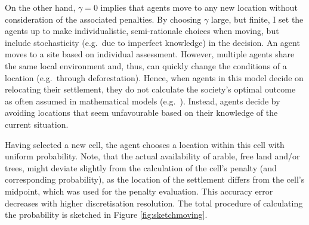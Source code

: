 On the other hand, $\gamma=0$ implies that agents move to any new location without consideration of the associated penalties.
By choosing $\gamma$ large, but finite, I set the agents up to make individualistic, semi-rationale choices when moving, but include stochasticity (e.g.\ due to imperfect knowledge) in the decision.
An agent moves to a site based on individual assessment.
However, multiple agents share the same local environment and, thus, can quickly change the conditions of a location (e.g.\ through deforestation). 
Hence, when agents in this model decide on relocating their settlement, they do not calculate the society's optimal outcome as often assumed in mathematical models (e.g.\ \citet{Good2006}).
Instead, agents decide by avoiding locations that seem unfavourable based on their knowledge of the current situation.

Having selected a new cell, the agent chooses a location within this cell with uniform probability.
Note, that the actual availability of arable, free land and/or trees, might deviate slightly from the calculation of the cell's penalty (and corresponding probability), as the location of the settlement differs from the cell's midpoint, which was used for the penalty evaluation.
This accuracy error decreases with higher discretisation resolution.
The total procedure of calculating the probability is sketched in Figure \ref{fig:sketchmoving}.

